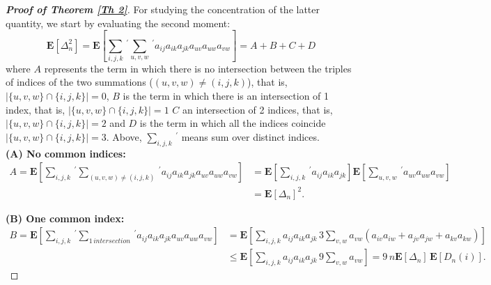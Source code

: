\documentclass[11pt, reqno]{amsart}
\numberwithin{equation}{section}
\theoremstyle{plain} %
\theoremstyle{definition} %
\begin{document}
\begin{proof}[{\bf Proof of Theorem \ref{Th 2}}]
For studying the concentration of the latter quantity, we start by  evaluating the second moment:
\begin{equation}
       \mathbf{E}\left[{\Delta_n^2}\right] =   \mathbf{E}\left[ \sum_{i,j,k}\,^{'} \sum_{u,v,w}\,^{'}  a_{ij} a_{ik} a_{jk} a_{uv} a_{uw} a_{vw} \right] = A + B + C + D
\end{equation}
where $A$ represents the term in which there is no intersection between the triples of indices of the two summations ($(u, v, w) \neq (i, j, k)$), that is, $|\{u, v, w\}\cap \{i,j,k\}|=0$, $B$ is the term in which there is an intersection of 1 index, that is, $|\{u, v, w\}\cap \{i,j,k\}|=1$ $C$ an intersection of 2 indices, that is, $|\{u, v, w\}\cap \{i,j,k\}|=2$ and $D$ is the term in which all the indices coincide $|\{u, v, w\}\cap \{i,j,k\}|=3$. Above,  $\sum_{i,j,k}\,^{'}$ means sum over distinct indices.\\ 

\textbf{(A) No common indices:}
\begin{equation}
\begin{split}
  A= \mathbf{E}\left[ \sum_{i,j,k}\,^{'} \sum_{(u,v,w) \neq (i,j,k)}\,^{'}  a_{ij} a_{ik} a_{jk} a_{uv} a_{uw} a_{vw} \right]  &=   \mathbf{E}\left[ \sum_{i,j,k}\,^{'}   a_{ij} a_{ik} a_{jk} \right] \mathbf{E}\left[ \sum_{u,v,w}\,^{'} a_{uv} a_{uw} a_{vw} \right]  \\
   &=  \mathbf{E}\left[\Delta_n\right]^2.
\end{split}
\end{equation}

\textbf{(B) One common index:} 
\begin{equation}
    \begin{split}
   B= \mathbf{E}\left[ \sum_{i,j,k}\,^{'}    \sum_{1 \, intersection}\,^{'} a_{ij} a_{ik} a_{jk} a_{uv} a_{uw} a_{vw} \right]  &=\mathbf{E}\left[ \sum_{i,j,k} a_{ij}a_{ik}a_{jk} \, 3\sum_{v,w}a_{vw}(a_{iv}a_{iw} + a_{jv}a_{jw} + a_{kv}a_{kw}) \right]\\
    &\leq \mathbf{E}\left[ \sum_{i,j,k} a_{ij}a_{ik}a_{jk} \, 9\sum_{v,w}a_{vw} \right]
    = 9 \,n  \mathbf{E}\left[   \Delta_n \right]  \, \mathbf{E}\left[   D_n(i) \right].
    \end{split}
\end{equation}


\end{proof}
\end{document}
